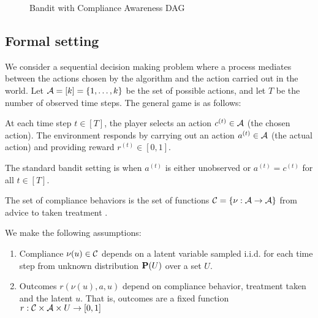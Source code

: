 \begin{figure*}[t]
	\centering	
	
	\caption{Bandit with Compliance Awareness DAG}
\end{figure*}


\subsection{Formal setting}
\label{sec:formal}

We consider a sequential decision making problem where a process mediates between the actions chosen by the algorithm and the action carried out in the world. Let ${\mathcal A}=[k]=\{1,\ldots,k\}$ be the set of possible actions, and let $T$ be the number of observed time steps. The general game is as follows:

\begin{defn}\label{def:compliance_bandit}\eod
	At each time step $t\in[T]$, the player selects an action $c^{(t)}\in {\mathcal A}$ (the chosen action). The environment responds by carrying out an action $a^{(t)}\in{\mathcal A}$ (the actual action) and providing reward $r^{(t)}\in[0,1]$.
\end{defn}
The standard bandit setting is when $a^{(t)}$ is either unobserved or $a^{(t)}=c^{(t)}$ for all $t\in[T]$.


The set of compliance behaviors is the set of functions ${\mathcal C}=\{\nu:{\mathcal A}\rightarrow{\mathcal A}\}$ from advice to taken treatment \cite{koller:09}. 

\begin{defn}\label{def:assumptions}\eod
	We make the following assumptions:
	\begin{enumerate}
		\item Compliance $\nu(u)\in{\mathcal C}$ depends on a latent variable sampled i.i.d. for each time step from unknown distribution ${\mathbf P}(U)$ over a set $U$.
		\item Outcomes $r(\nu(u),a,u)$ depend on compliance behavior, treatment taken and the latent $u$. That is, outcomes are a fixed function $r:{\mathcal C}\times {\mathcal A}\times U\rightarrow[0,1]$
	\end{enumerate}
\end{defn}

